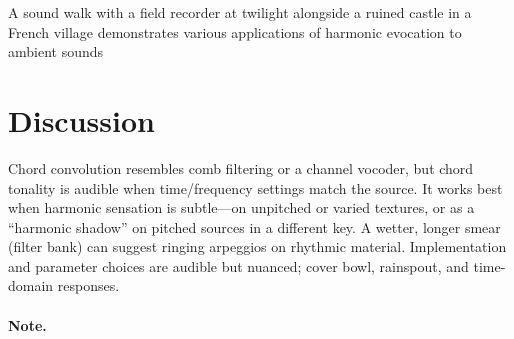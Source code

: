 \documentclass[runningheads,a4paper]{llncs}
\begin{document}
A sound walk with a field recorder at twilight alongside a ruined castle in a 
French village demonstrates various applications of harmonic evocation to 
ambient sounds \submissioncitesoundwalk

\section{Discussion}

Chord convolution resembles comb filtering or a channel vocoder, but chord
tonality is audible when time/frequency settings match the source. It works
best when harmonic sensation is subtle---on unpitched or varied textures, or as
a ``harmonic shadow'' on pitched sources in a different key. A wetter, longer
smear (filter bank) can suggest ringing arpeggios on rhythmic material.
Implementation and parameter choices are audible but nuanced;
\submissiongithubsupplement{} cover bowl, rainspout, and time-domain responses.

\paragraph{Note.}
\submissionainote{}



\end{document}
